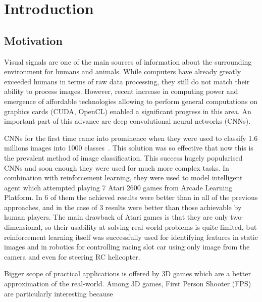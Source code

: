
\chapter{Introduction}
\label{ch:introduction}
\section{Motivation}

Visual signals are one of the main sources of information about the surrounding environment for humans and animals.
While computers have already greatly exceeded humans in terms of raw data processing, they still do not match their ability to process images.
However, recent increase in computing power and emergence of affordable technologies allowing to perform general computations on graphics cards (CUDA, OpenCL) enabled a significant progress in this area.
An important part of this advance are deep convolutional neural networks (CNNs).


CNNs for the first time came into prominence when they were used to classify 1.6 millions images into 1000 classes~\cite{NIPS2012_4824}.
This solution was so effective that now this is the prevalent method of image classification.
This success hugely popularised CNNs and soon enough they were used for much more complex tasks.
In combination with reinforcement learning, they were used to model intelligent agent which attempted playing 7 Atari 2600 games from Arcade Learning Platform\cite{mnih-atari-2013}.
In 6 of them the achieved results were better than in all of the previous approaches, and in the case of 3 results were better than those achievable by human players.
The main drawback of Atari games is that they are only two-dimensional, so their usability at solving real-world problems is quite limited, but reinforcement learning itself was successfully used for identifying features in static images \cite{conf/cvpr/GoodrichA12} and in robotics for controlling racing slot car using only image from the camera \cite{rieijcnn12} and even for steering RC helicopter\cite{Abbeel07anapplication}.

Bigger scope of practical applications is offered by 3D games which are a better approximation of the real-world.
Among 3D games, First Person Shooter (FPS) are particularly interesting because 

